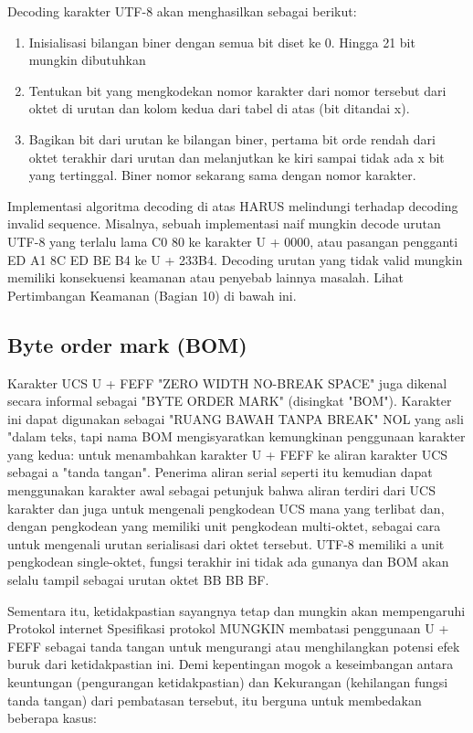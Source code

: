    Decoding karakter UTF-8 akan menghasilkan sebagai berikut:
   \begin{enumerate}
   \item Inisialisasi bilangan biner dengan semua bit diset ke 0. Hingga 21 bit
       mungkin dibutuhkan

   \item Tentukan bit yang mengkodekan nomor karakter dari nomor tersebut
       dari oktet di urutan dan kolom kedua dari tabel
       di atas (bit ditandai x).

   \item Bagikan bit dari urutan ke bilangan biner, pertama
       bit orde rendah dari oktet terakhir dari urutan dan
       melanjutkan ke kiri sampai tidak ada x bit yang tertinggal. Biner
       nomor sekarang sama dengan nomor karakter.
    \end{enumerate}
   Implementasi algoritma decoding di atas HARUS melindungi terhadap
   decoding invalid sequence. Misalnya, sebuah implementasi naif mungkin
   decode urutan UTF-8 yang terlalu lama C0 80 ke karakter U + 0000,
   atau pasangan pengganti ED A1 8C ED BE B4 ke U + 233B4. Decoding
   urutan yang tidak valid mungkin memiliki konsekuensi keamanan atau penyebab lainnya
   masalah. Lihat Pertimbangan Keamanan (Bagian 10) di bawah ini.

	\subsection{Byte order mark (BOM)}
   Karakter UCS U + FEFF "ZERO WIDTH NO-BREAK SPACE" juga dikenal
   secara informal sebagai "BYTE ORDER MARK" (disingkat "BOM"). Karakter ini
   dapat digunakan sebagai "RUANG BAWAH TANPA BREAK" NOL yang asli "dalam teks, tapi
   nama BOM mengisyaratkan kemungkinan penggunaan karakter yang kedua: untuk
   menambahkan karakter U + FEFF ke aliran karakter UCS sebagai a
   "tanda tangan". Penerima aliran serial seperti itu kemudian dapat menggunakan
   karakter awal sebagai petunjuk bahwa aliran terdiri dari UCS
   karakter dan juga untuk mengenali pengkodean UCS mana yang terlibat dan,
   dengan pengkodean yang memiliki unit pengkodean multi-oktet, sebagai cara untuk mengenali urutan serialisasi dari oktet tersebut. UTF-8 memiliki a
   unit pengkodean single-oktet, fungsi terakhir ini tidak ada gunanya dan BOM
   akan selalu tampil sebagai urutan oktet BB BB BF.

Sementara itu, ketidakpastian sayangnya tetap dan mungkin akan mempengaruhi
   Protokol internet Spesifikasi protokol MUNGKIN membatasi penggunaan
   U + FEFF sebagai tanda tangan untuk mengurangi atau menghilangkan potensi
   efek buruk dari ketidakpastian ini. Demi kepentingan mogok a
   keseimbangan antara keuntungan (pengurangan ketidakpastian) dan
   Kekurangan (kehilangan fungsi tanda tangan) dari pembatasan tersebut, itu
   berguna untuk membedakan beberapa kasus:

